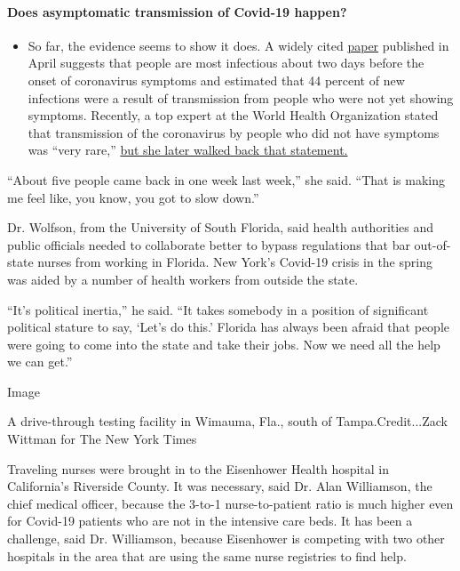 \begin{itemize}
{  \paragraph{Does asymptomatic transmission of Covid-19
  happen?}\label{does-asymptomatic-transmission-of-covid-19-happen}}

  \begin{itemize}
  \tightlist
  \item
    So far, the evidence seems to show it does. A widely cited
    \href{https://www.nature.com/articles/s41591-020-0869-5}{paper}
    published in April suggests that people are most infectious about
    two days before the onset of coronavirus symptoms and estimated that
    44 percent of new infections were a result of transmission from
    people who were not yet showing symptoms. Recently, a top expert at
    the World Health Organization stated that transmission of the
    coronavirus by people who did not have symptoms was ``very rare,''
    \href{https://www.nytimes.com/2020/06/09/world/coronavirus-updates.html?action=click\&pgtype=Article\&state=default\&region=MAIN_CONTENT_3\&context=storylines_faq\#link-1f302e21}{but
    she later walked back that statement.}
  \end{itemize}
\end{itemize}

``About five people came back in one week last week,'' she said. ``That
is making me feel like, you know, you got to slow down.''

Dr. Wolfson, from the University of South Florida, said health
authorities and public officials needed to collaborate better to bypass
regulations that bar out-of-state nurses from working in Florida. New
York's Covid-19 crisis in the spring was aided by a number of health
workers from outside the state.

``It's political inertia,'' he said. ``It takes somebody in a position
of significant political stature to say, `Let's do this.' Florida has
always been afraid that people were going to come into the state and
take their jobs. Now we need all the help we can get.''

Image

A drive-through testing facility in Wimauma, Fla., south of
Tampa.Credit...Zack Wittman for The New York Times

Traveling nurses were brought in to the Eisenhower Health hospital in
California's Riverside County. It was necessary, said Dr. Alan
Williamson, the chief medical officer, because the 3-to-1
nurse-to-patient ratio is much higher even for Covid-19 patients who are
not in the intensive care beds. It has been a challenge, said Dr.
Williamson, because Eisenhower is competing with two other hospitals in
the area that are using the same nurse registries to find help.

